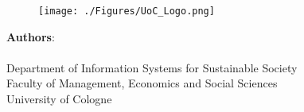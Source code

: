 \makeatletter
\begin{titlepage}
    \begin{center}
        \vspace{0.9cm}

        \Large
        \textbf{\@title}

        \vspace{0.9cm}
        
        \thesistype{}
        
        \vspace{0.9cm}

        \begin{figure}[htbp]
             \centering
             \texttt{[image: ./Figures/UoC\_Logo.png]}
        \end{figure}

        \vspace{1cm}

        \large
        \textbf{Authors}: \\
         \\

        \vspace{1cm}
        \large
        Department of Information Systems for Sustainable Society\\
        Faculty of Management, Economics and Social Sciences\\
        University of Cologne\\

        \vspace{1cm}
        \@date

    \end{center}
\end{titlepage}
\makeatother